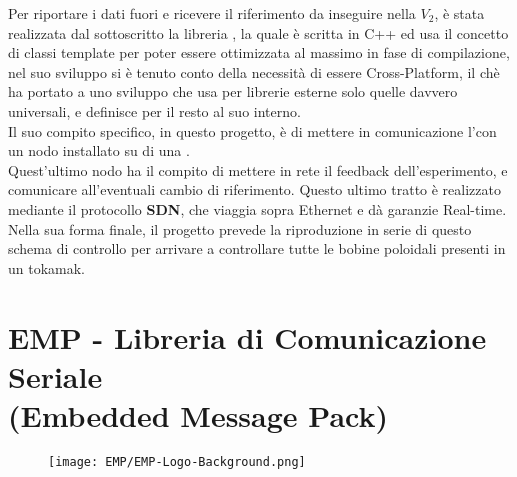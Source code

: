 \noindent
Per riportare i dati fuori e ricevere il riferimento da inseguire nella $V_2$, è stata realizzata dal sottoscritto la libreria \cite*{EMP}, la quale è scritta in C++ ed usa il concetto di classi template per poter essere ottimizzata al massimo in fase di compilazione, nel suo sviluppo si è tenuto conto della necessità di essere Cross-Platform, il chè ha portato a uno sviluppo che usa per librerie esterne solo quelle davvero universali, e definisce per il resto al suo interno.\\
Il suo compito specifico, in questo progetto, è di mettere in comunicazione l'\ArduinoUno con un nodo \MARTe installato su di una \Rasp.\\
Quest'ultimo nodo ha il compito di mettere in rete il feedback dell'esperimento, e comunicare all'\ArduinoUno eventuali cambio di riferimento. Questo ultimo tratto è realizzato mediante il protocollo \textbf{SDN}, che viaggia sopra Ethernet e dà garanzie Real-time.\\
Nella sua forma finale, il progetto prevede la riproduzione in serie di questo schema di controllo per arrivare a controllare tutte le bobine poloidali presenti in un tokamak.

\newpage

\section*{EMP - Libreria di Comunicazione Seriale\\ (Embedded Message Pack)}\label{sec:EMP}
\vspace{-5mm}
\begin{figure}[H]
	\centering
	\texttt{[image: EMP/EMP-Logo-Background.png]}
\end{figure}\vspace{-10mm}
